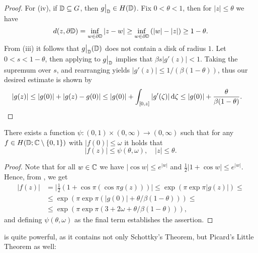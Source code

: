 \begin{proof}
    For (iv), if $\mathbb{D} \subseteq G$, then $\restr{g}{\D} \in H(\D)$. Fix $0 < \theta < 1$, then for $\vert z \vert \leq \theta$ we have
    $$ d(z, \partial \mathbb{D}) = \inf_{w \in \partial \mathbb{D}} \vert z - w \vert \geq \inf_{w \in \partial \mathbb{D}} \left( \vert w \vert - \vert z \vert \right) \geq 1 - \theta. $$
    From (iii) it follows that $\restr{g}{\D}(\D)$ does not contain a disk of radius $1$. Let $0 < s < 1 - \theta$, then applying  to $\restr{g}{\D}$ implies that $\beta s \vert g'(z) \vert < 1$. Taking the supremum over $s$, and rearranging yields $ \vert g'(z) \vert \leq 1 / (\beta (1 - \theta))$, thus our desired estimate is shown by
    \begin{align*}
        \vert g(z) \vert &\leq \vert g(0) \vert + \vert g(z) - g(0) \vert \leq \vert g(0) \vert + \int_{[0, z]} \vert g'(\zeta) \vert \mathop{}\!\mathrm{d} \zeta \leq \vert g(0) \vert + \frac{\theta}{\beta (1 - \theta)}. \qedhere
    \end{align*}
\end{proof}

\begin{theorem}[Schottky] \label{thm:schottky}
    There exists a function ${\psi : (0, 1) \times (0, \infty) \to (0, \infty)}$ such that for any $f \in H(\mathbb{D}; \mathbb{C} \setminus \{ 0, 1 \})$ with $\vert f(0) \vert \leq \omega$ it holds that
    \begin{equation}
        \vert f(z) \vert \leq \psi(\theta, \omega), \quad \vert z \vert \leq \theta.
    \end{equation}
\end{theorem}

\begin{proof}
    Note that for all $w \in \mathbb{C}$ we have $\vert \cos w \vert \leq e^{\vert w \vert}$ and $\frac{1}{2} \vert 1 + \cos w \vert \leq e^{\vert w \vert}$. Hence, from , we get
    \begin{align*}
        \vert f(z) \vert &= \vert {\textstyle \frac{1}{2}} ( 1 + \cos \pi ( \cos \pi g(z) ) ) \vert \leq \exp ( \pi \exp \pi \vert g(z) \vert ) \leq \\ &\leq \exp (\pi \exp \pi (\vert g(0) \vert + \theta / \beta(1 - \theta))) \leq \\
        &\leq \exp ( \pi \exp \pi ( 3 + 2 \omega + \theta / \beta(1 - \theta) ) ),
    \end{align*}
    and defining $\psi(\theta, \omega)$ as the final term establishes the assertion.
\end{proof}

 is quite powerful, as it contains not only Schottky's Theorem, but Picard's Little Theorem as well:

